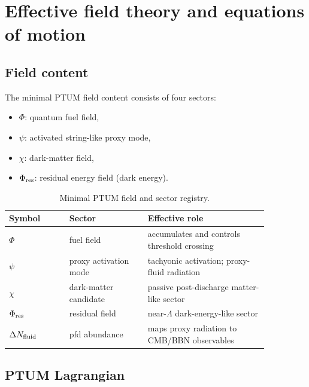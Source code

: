 \documentclass[epj]{svjour}
\begin{document}
\section{Effective field theory and equations of motion}
\label{sec:eft}

\subsection{Field content}

The minimal PTUM field content consists of four sectors:

\begin{itemize}
\item \(\Phi\): quantum fuel field,
\item \(\psi\): activated string-like proxy mode,
\item \(\chi\): dark-matter field,
\item \(\Phi_{\rm res}\): residual energy field (dark energy).
\end{itemize}

\begin{table}[t]
\centering
\small
\caption{Minimal PTUM field and sector registry.}
\label{tab:ptum_field_registry}
\begin{tabular}{@{}>{\raggedright\arraybackslash}p{0.20\linewidth}>{\raggedright\arraybackslash}p{0.26\linewidth}>{\raggedright\arraybackslash}p{0.40\linewidth}@{}}
\toprule
Symbol & Sector & Effective role \\
\midrule
$\Phi$ & fuel field & accumulates and controls threshold crossing \\
$\psi$ & proxy activation mode & tachyonic activation; proxy-fluid radiation \\
$\chi$ & dark-matter candidate & passive post-discharge matter-like sector \\
$\Phi_{\rm res}$ & residual field & near-$\Lambda$ dark-energy-like sector \\
$\Delta N_{\rm fluid}$ & pfd abundance & maps proxy radiation to CMB/BBN observables \\
\bottomrule
\end{tabular}
\end{table}

\subsection{PTUM Lagrangian}
\end{document}
